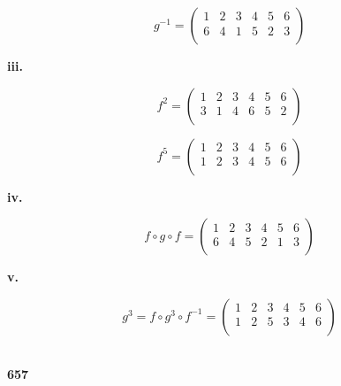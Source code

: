 \documentclass[UTF8]{ctexart}
\begin{document}
    \begin{equation*}
        g^{-1}=
        \begin{pmatrix}
            1 & 2 & 3 & 4 & 5 & 6  \\
            6 & 4 & 1 & 5 & 2 & 3  \\
        \end{pmatrix}
    \end{equation*}

    \textbf{iii.}

    \begin{equation*}
        f^{2}=
        \begin{pmatrix}
            1 & 2 & 3 & 4 & 5 & 6  \\
            3 & 1 & 4 & 6 & 5 & 2  \\
        \end{pmatrix}
    \end{equation*}

    \begin{equation*}
        f^{5}=
        \begin{pmatrix}
            1 & 2 & 3 & 4 & 5 & 6  \\
            1 & 2 & 3 & 4 & 5 & 6  \\
        \end{pmatrix}
    \end{equation*}

    \textbf{iv.}

    \begin{equation*}
        f\circ g\circ f=
        \begin{pmatrix}
            1 & 2 & 3 & 4 & 5 & 6  \\
            6 & 4 & 5 & 2 & 1 & 3  \\
        \end{pmatrix}
    \end{equation*}

    \textbf{v.}

    \begin{equation*}
        g^3=f\circ g^3\circ f^{-1}=
        \begin{pmatrix}
            1 & 2 & 3 & 4 & 5 & 6  \\
            1 & 2 & 5 & 3 & 4 & 6  \\
        \end{pmatrix}
    \end{equation*}

    ~\\
    \noindent\textbf{657}
\end{document}
